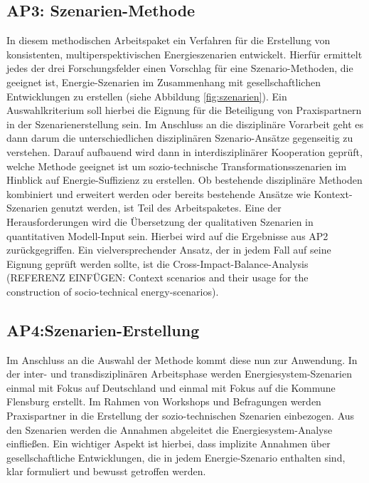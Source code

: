 \documentclass[a4paper,11pt,twoside]{scrartcl}
\begin{document}
\subsection*{AP3: Szenarien-Methode}
In diesem methodischen Arbeitspaket ein Verfahren für die Erstellung von konsistenten, multiperspektivischen Energieszenarien entwickelt. Hierfür ermittelt jedes der drei Forschungsfelder einen Vorschlag für eine Szenario-Methoden, die geeignet ist, Energie-Szenarien im Zusammenhang mit gesellschaftlichen Entwicklungen zu erstellen (siehe Abbildung \ref{fig:szenarien}). Ein Auswahlkriterium soll hierbei die Eignung für die Beteiligung von Praxispartnern in der Szenarienerstellung sein. Im Anschluss an die disziplinäre Vorarbeit geht es dann darum die unterschiedlichen disziplinären Szenario-Ansätze gegenseitig zu verstehen. Darauf aufbauend wird dann in interdisziplinärer Kooperation geprüft, welche Methode geeignet ist um sozio-technische Transformationsszenarien im Hinblick auf Energie-Suffizienz zu erstellen. Ob bestehende disziplinäre Methoden kombiniert und erweitert werden oder bereits bestehende Ansätze wie Kontext-Szenarien genutzt werden, ist Teil des Arbeitspaketes. Eine der Herausforderungen wird die Übersetzung der qualitativen Szenarien in quantitativen Modell-Input sein. Hierbei wird auf die Ergebnisse aus AP2 zurückgegriffen. Ein vielversprechender Ansatz, der in jedem Fall auf seine Eignung geprüft werden sollte, ist die Cross-Impact-Balance-Analysis (REFERENZ EINFÜGEN: Context scenarios and their usage for the construction of socio-technical energy-scenarios).

\subsection*{AP4:Szenarien-Erstellung}
Im Anschluss an die Auswahl der Methode kommt diese nun zur Anwendung. In der inter- und transdisziplinären Arbeitsphase werden Energiesystem-Szenarien einmal mit Fokus auf Deutschland und einmal mit Fokus auf die Kommune Flensburg erstellt. Im Rahmen von Workshops und Befragungen werden Praxispartner in die Erstellung der sozio-technischen Szenarien einbezogen. Aus den Szenarien werden die Annahmen abgeleitet die Energiesystem-Analyse einfließen. Ein wichtiger Aspekt ist hierbei, dass implizite Annahmen über gesellschaftliche Entwicklungen, die in jedem Energie-Szenario enthalten sind, klar formuliert und bewusst getroffen werden.
\end{document}
